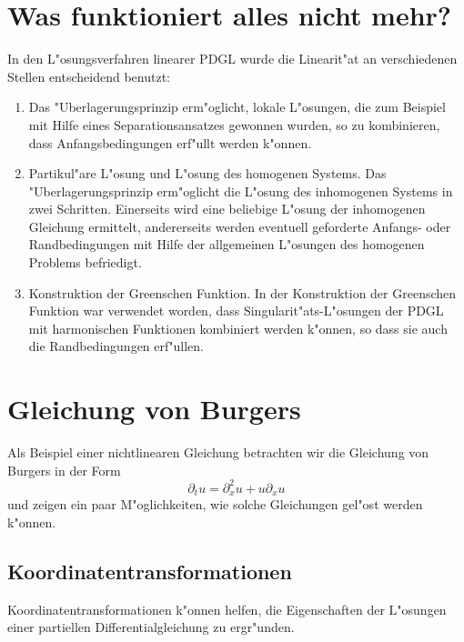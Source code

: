 \section{Was funktioniert alles nicht mehr?}
In den L"osungsverfahren linearer PDGL wurde die Linearit"at an verschiedenen
Stellen entscheidend benutzt:
\begin{enumerate}
\item
Das "Uberlagerungsprinzip erm"oglicht, lokale L"osungen, die zum Beispiel
mit Hilfe eines Separationsansatzes gewonnen wurden, so zu kombinieren, dass
Anfangsbedingungen erf"ullt werden k"onnen.
\item
Partikul"are L"osung und L"osung des homogenen Systems.
Das "Uberlagerungsprinzip erm"oglicht die L"osung des inhomogenen Systems
in zwei Schritten. Einerseits wird eine beliebige L"osung der inhomogenen
Gleichung ermittelt, andererseits werden eventuell geforderte Anfangs-
oder Randbedingungen mit Hilfe der allgemeinen L"osungen des homogenen
Problems befriedigt.
\item
Konstruktion der Greenschen Funktion. In der Konstruktion der
Greenschen Funktion war verwendet worden, dass Singularit"ats-L"osungen 
der PDGL mit harmonischen Funktionen kombiniert werden k"onnen, so 
dass sie auch die Randbedingungen erf"ullen.
\end{enumerate}

\section{Gleichung von Burgers\label{burgers}}
Als Beispiel einer nichtlinearen Gleichung betrachten wir die Gleichung
von Burgers in der Form
$$\partial_t u=\partial_x^2u+u\partial_xu$$
und zeigen ein paar M"oglichkeiten, wie solche Gleichungen
gel"ost werden k"onnen.

\subsection{Koordinatentransformationen}
Koordinatentransformationen k"onnen helfen, die Eigenschaften der
L"osungen einer partiellen Differentialgleichung zu ergr"unden.

